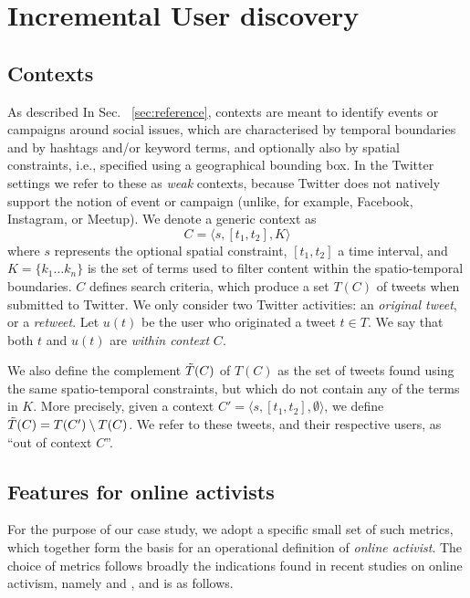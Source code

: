 \documentclass[runningheads]{llncs}
\begin{document}
\section{Incremental User discovery}


\subsection{Contexts} \label{sec:contexts}

As described In Sec. ~\ref{sec:reference}, contexts are meant to identify events or campaigns around social issues, which are characterised by temporal boundaries and by hashtags and/or keyword terms, and optionally also by spatial constraints, i.e., specified using a geographical bounding box.
In the Twitter settings we refer to these as \textit{weak} contexts, because Twitter does not natively support the notion of event or campaign (unlike, for example, Facebook, Instagram, or Meetup).
We  denote a generic context as
\begin{equation}
C = \langle s, [t_1, t_2], K \rangle 
\label{eq:context}
\end{equation}
where  $s$ represents the optional spatial constraint, $[t_1, t_2]$ a time interval, and $K = \{ k_1 \dots k_n\}$ is the set of terms used to filter content within the spatio-temporal boundaries.
%
$C$ defines search criteria, which produce a set $T(C)$ of tweets when submitted to Twitter.
We only consider two Twitter activities: an \textit{original tweet}, or a \textit{retweet}.
Let $u(t)$ be the user who originated a tweet $t \in T$.
We say that both $t$ and  $u(t)$ are \textit{within context} $C$.

We also define the complement $\Tilde{T}(C)$ of $T(C)$ as the set of tweets found using the same spatio-temporal constraints, but which do not contain any of the terms in $K$. More precisely, given a  context $C'= \langle s, [t_1, t_2], \emptyset \rangle$, we define $\Tilde{T}(C) = T(C') \setminus T(C)$. 
We refer to these tweets, and their respective users, as ``out of context $C$''.



\subsection{Features  for online activists}

For the purpose of our case study, we adopt a specific small set of such metrics, which together form   the basis for an operational definition of \textit{online activist}.
The choice of metrics follows broadly the indications found in recent studies on online activism, namely \cite{Lotan2011} and  \cite{Poell2014}, and is as follows.
\end{document}
